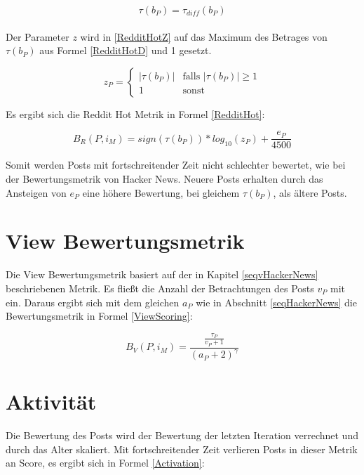 \begin{equation}
\label{RedditHotD}
\tau(b_{P}) = \tau_{diff}(b_{P})
\end{equation}
\\
Der Parameter $z$ wird in \ref{RedditHotZ} auf das Maximum des Betrages von $ \tau(b_{P})$ aus Formel \ref{RedditHotD} und 1 gesetzt.

\begin{equation}
\label{RedditHotZ}
z_{P}  = \begin{cases}
|\tau(b_{P})| &\text{falls $|\tau(b_{P})| \geq 1$}\\
1 &\text{sonst}
\end{cases}
\end{equation}

Es ergibt sich die Reddit Hot Metrik in Formel \ref{RedditHot}:

\begin{equation}
\label{RedditHot}
B_R(P,i_M) = sign(\tau(b_{P})) * log_{10}(z_{P}) + \frac{e_{P}}{4500}
\end{equation}

Somit werden Posts mit fortschreitender Zeit nicht schlechter bewertet, wie bei der Bewertungsmetrik von Hacker News. Neuere Posts erhalten durch das Ansteigen von $e_P$ eine höhere Bewertung, bei gleichem $\tau(b_P)$, als ältere Posts. 
 

\section{View Bewertungsmetrik}

Die View Bewertungsmetrik basiert auf der in Kapitel \ref{seqvHackerNews} beschriebenen Metrik. Es fließt die Anzahl der Betrachtungen des Posts $v_P$ mit ein. Daraus ergibt sich mit dem gleichen $a_P$ wie in Abschnitt \ref{seqHackerNews}  die Bewertungsmetrik in Formel \ref{ViewScoring}:

\begin{equation}
\label{ViewScoring}
B_V(P,i_M) = \frac{\frac{\tau_{P}}{v_{P} + 1}}{(a_{P} + 2)^{\gamma}}
\end{equation}

\section{Aktivität}

Die Bewertung des Posts wird der Bewertung der letzten Iteration verrechnet und durch das Alter skaliert. Mit fortschreitender Zeit verlieren Posts in dieser Metrik an Score, es ergibt sich in Formel \ref{Activation}:

